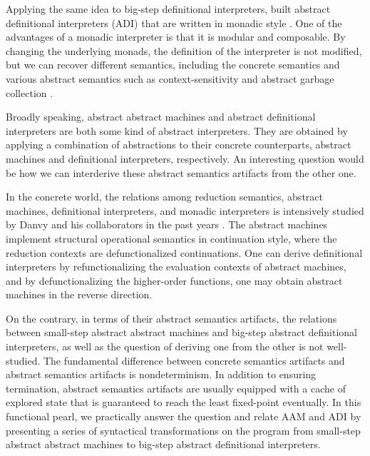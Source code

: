 \documentclass[acmsmall,review,anonymous]{acmart}\settopmatter{printfolios=true,printccs=false,printacmref=false}
\begin{document}
Applying the same idea to big-step definitional interpreters, \citeauthor{darais2017abstracting}
built abstract definitional interpreters (ADI) that are written in monadic style \cite{darais2017abstracting}.
One of the advantages of a monadic interpreter is that it is modular and composable.
By changing the underlying monads, the definition of the interpreter is not modified,
but we can recover different semantics, including the concrete semantics and various
abstract semantics such as context-sensitivity and abstract garbage collection \cite{Sergey:2013:MAI:2491956.2491979}.

Broadly speaking, abstract abstract machines and abstract definitional
interpreters are both some kind of abstract interpreters.
They are obtained by applying a combination of abstractions to their
concrete counterparts, abstract machines and definitional interpreters, respectively.
An interesting question would be how we can interderive these abstract semantics artifacts
from the other one.

In the concrete world, the relations among reduction semantics, abstract machines,
definitional interpreters, and monadic interpreters is intensively studied by Danvy and his
collaborators in the past years
\cite{Ager:2003:FCE:888251.888254, Danvy:2001:DW:773184.773202, danvy2004refocusing, Danvy:2008:DIP:1411204.1411206, AGER2004223, ager2005functional, Danvy:2006:RW:2171265.2171268, danvy2009towards, biernacka2009towards}.
The abstract machines implement structural operational semantics in continuation style,
where the reduction contexts are defunctionalized continuations. One can derive definitional
interpreters by refunctionalizing the evaluation contexts of abstract machines,
and by defunctionalizing the higher-order functions, one may obtain abstract machines in the
reverse direction.

On the contrary, in terms of their abstract semantics artifacts,
the relations between small-step abstract abstract machines and big-step abstract
definitional interpreters, as well as the question of deriving one from the other is not
well-studied.
The fundamental difference between concrete semantics artifacts and abstract semantics
artifacts is nondeterminism. In addition to ensuring termination, abstract semantics
artifacts are usually equipped with a cache of explored state that is guaranteed to reach
the least fixed-point eventually.
In this functional pearl, we practically answer the question and relate AAM and ADI
by presenting a series of syntactical transformations on the program from
small-step abstract abstract machines to big-step abstract definitional interpreters.
\end{document}

